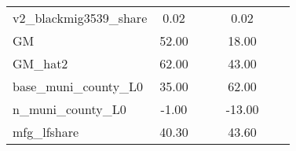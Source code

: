 \begin{table}[htbp]
\begin{tabular}{l*{2}{ccc}}
v2\_blackmig3539\_share&        0.02&            &            &        0.02&            &            \\
GM                  &       52.00&            &            &       18.00&            &            \\
GM\_hat2             &       62.00&            &            &       43.00&            &            \\
base\_muni\_county\_L0 &       35.00&            &            &       62.00&            &            \\
n\_muni\_county\_L0    &       -1.00&            &            &      -13.00&            &            \\
mfg\_lfshare         &       40.30&            &            &       43.60&            &            \\
\bottomrule
\end{tabular}
\end{table}
